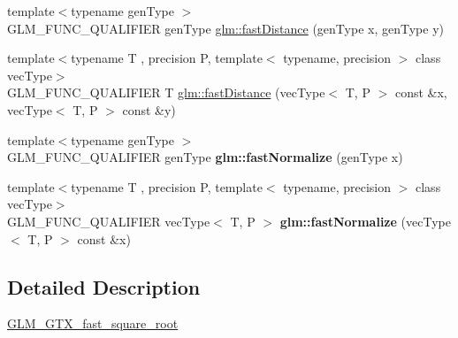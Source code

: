 \begin{DoxyCompactItemize}
\item 
{\footnotesize template$<$typename gen\+Type $>$ }\\G\+L\+M\+\_\+\+F\+U\+N\+C\+\_\+\+Q\+U\+A\+L\+I\+F\+I\+ER gen\+Type \hyperlink{group__gtx__fast__square__root_gaac333418d0c4e0cc6d3d219ed606c238}{glm\+::fast\+Distance} (gen\+Type x, gen\+Type y)
\item 
{\footnotesize template$<$typename T , precision P, template$<$ typename, precision $>$ class vec\+Type$>$ }\\G\+L\+M\+\_\+\+F\+U\+N\+C\+\_\+\+Q\+U\+A\+L\+I\+F\+I\+ER T \hyperlink{group__gtx__fast__square__root_ga6d1ac559cd77d69119e30c3aca0e14b5}{glm\+::fast\+Distance} (vec\+Type$<$ T, P $>$ const \&x, vec\+Type$<$ T, P $>$ const \&y)
\item 
\mbox{\label{fast__square__root_8inl_ae90408b1ac7a31212f0de6e19f6373aa}} 
{\footnotesize template$<$typename gen\+Type $>$ }\\G\+L\+M\+\_\+\+F\+U\+N\+C\+\_\+\+Q\+U\+A\+L\+I\+F\+I\+ER gen\+Type {\bfseries glm\+::fast\+Normalize} (gen\+Type x)
\item 
\mbox{\label{fast__square__root_8inl_a30d366d62d66b3de535a2ec6dedcb370}} 
{\footnotesize template$<$typename T , precision P, template$<$ typename, precision $>$ class vec\+Type$>$ }\\G\+L\+M\+\_\+\+F\+U\+N\+C\+\_\+\+Q\+U\+A\+L\+I\+F\+I\+ER vec\+Type$<$ T, P $>$ {\bfseries glm\+::fast\+Normalize} (vec\+Type$<$ T, P $>$ const \&x)
\end{DoxyCompactItemize}


\subsection{Detailed Description}
\hyperlink{group__gtx__fast__square__root}{G\+L\+M\+\_\+\+G\+T\+X\+\_\+fast\+\_\+square\+\_\+root} 